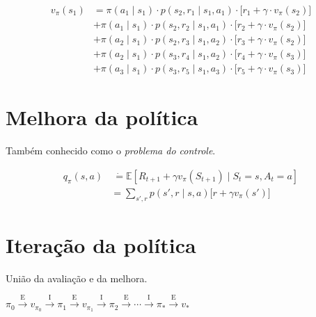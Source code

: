 \documentclass{article}
\begin{document}
            \begin{equation}
                \begin{split}
                    v_\pi(s_1) &= \pi(a_1 \mid s_1) \cdot p(s_2, r_1 \mid s_1, a_1) \cdot \Big[ r_1 + \gamma \cdot v_\pi(s_2) \Big] \\
                               &+ \pi(a_1 \mid s_1) \cdot p(s_2, r_2 \mid s_1, a_1) \cdot \Big[ r_2 + \gamma \cdot v_\pi(s_2) \Big] \\
                               &+ \pi(a_2 \mid s_1) \cdot p(s_2, r_3 \mid s_1, a_2) \cdot \Big[ r_3 + \gamma \cdot v_\pi(s_2) \Big] \\
                               &+ \pi(a_2 \mid s_1) \cdot p(s_3, r_4 \mid s_1, a_2) \cdot \Big[ r_4 + \gamma \cdot v_\pi(s_3) \Big] \\
                               &+ \pi(a_3 \mid s_1) \cdot p(s_3, r_5 \mid s_1, a_3) \cdot \Big[ r_5 + \gamma \cdot v_\pi(s_3) \Big]
                \end{split}
            \end{equation}
        
    \section{Melhora da política}
    
        Também conhecido como o \textit{problema do controle}.
        
        \begin{equation}
            \begin{split}
                q_{\pi}(s,a) & \ \dot{=} \mathbb{E} \left[ R_{t+1} + \gamma v_{\pi}(S_{t+1}) \mid S_t = s, A_t = a \right] \\
                & = \sum_{s',r} p(s', r \mid s, a) \Big[ r + \gamma v_{\pi}(s') \Big]
            \end{split}
        \end{equation}
    
    \section{Iteração da política}
    
        União da avaliação e da melhora.
        
        \begin{center}
            \begin{math}
                \pi_0 \xrightarrow{\ \textrm{E} \ } 
                v_{\pi_0} \xrightarrow{\ \textrm{I} \ } 
                \pi_1 \xrightarrow{\ \textrm{E} \ } 
                v_{\pi_1} \xrightarrow{\ \textrm{I} \ } 
                \pi_2 \xrightarrow{\ \textrm{E} \ } 
                \cdots \xrightarrow{\ \textrm{I} \ }
                \pi_* \xrightarrow{\ \textrm{E} \ } v_{*}
            \end{math}
        \end{center}
        
\end{document}
